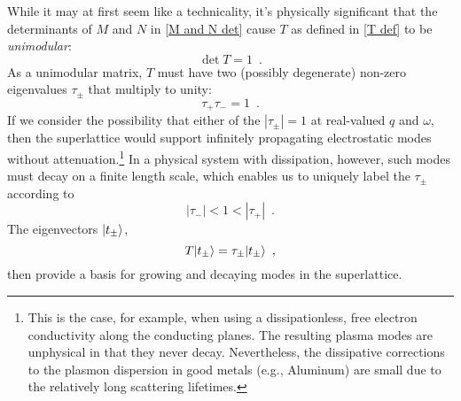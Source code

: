 While it may at first seem like a technicality, it's physically significant that the determinants of $M$ and $N$ in \eqref{M and N det} cause $T$ as defined in \eqref{T def} to be {\it unimodular}:
\begin{equation}
    \label{T det}
    \det T =1
    \,\,\,.
\end{equation}
As a unimodular matrix, $T$ must have two (possibly degenerate) non-zero eigenvalues $\tau_{\pm}$ that multiply to unity:
\begin{equation}
    \label{unimodular eigenvalues}
    \tau_+\tau_- = 1
    \,\,\,.
\end{equation}
If we consider the possibility that either of the $|\tau_\pm|=1$ at real-valued $q$ and $\omega$, then the superlattice would support infinitely propagating electrostatic modes without attenuation.\footnote{This is the case, for example, when using a dissipationless, free electron conductivity along the conducting planes.  The resulting plasma modes are unphysical in that they never decay.  Nevertheless, the dissipative corrections to the plasmon dispersion in good metals (e.g., Aluminum) are small due to the relatively long scattering lifetimes.}  In a physical system with dissipation, however, such modes must decay on a finite length scale, which enables us to uniquely label the $\tau_\pm$ according to
\begin{equation}
    \label{eigenvalue relation}
    |\tau_-|<1<|\tau_+|
    \,\,\,.
\end{equation}
The eigenvectors $\lvert t_\pm\rangle$,
\begin{equation}
    \label{eigenvector def}
    T\lvert t_\pm\rangle = \tau_\pm\lvert t_\pm\rangle
    \,\,\,,
\end{equation}
then provide a basis for growing and decaying modes in the superlattice.
